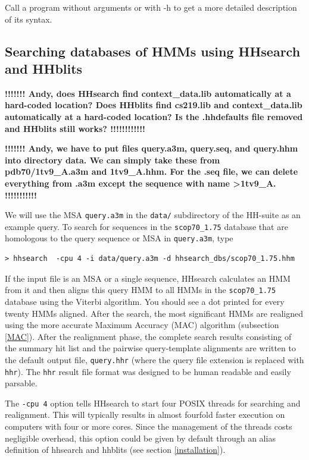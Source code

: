 \documentclass[11pt,a4paper]{article}
\begin{document}
Call a program without arguments or with -h to get a more detailed description of 
its syntax.


\subsection{Searching databases of HMMs using HHsearch and HHblits}\label{searching_hm_dbs}

{\bf !!!!!!! Andy, does HHsearch find context\_data.lib automatically at a hard-coded location? Does HHblits find cs219.lib and context\_data.lib automatically at a hard-coded location? Is the .hhdefaults file removed and HHblits still works? !!!!!!!!!!!!}

{\bf !!!!!!! Andy, we have to put files query.a3m, query.seq, and query.hhm into directory data. We can simply take these from pdb70/1tv9\_A.a3m and 1tv9\_A.hhm. For the .seq file, we can delete everything from .a3m except the sequence with name >1tv9\_A. !!!!!!!!!!!}

We will use the MSA \verb`query.a3m` in the \verb`data/` subdirectory of the HH-suite as an example query. To search for sequences in the \verb`scop70_1.75` database that are homologous to the query sequence or MSA in \verb`query.a3m`, type

\begin{verbatim}
> hhsearch  -cpu 4 -i data/query.a3m -d hhsearch_dbs/scop70_1.75.hhm
\end{verbatim}

If the input file is an MSA or a single sequence, HHsearch calculates an HMM from it
and then aligns this query HMM to all 
HMMs in the \verb`scop70_1.75` database using the Viterbi algorithm. 
You should see a dot printed for every twenty HMMs aligned. After the search, 
the most significant HMMs are realigned using the more accurate Maximum Accuracy (MAC) 
algorithm (subsection \ref{MAC}). After the realignment phase, the complete search results consisting of the 
summary hit list and the pairwise query-template alignments are written to the default 
output file, \verb`query.hhr` (where the query file extension is replaced with \verb`hhr`). 
The \verb`hhr` result file format was designed to be human readable and easily parsable.

The \verb`-cpu 4` option tells HHsearch to start four POSIX threads for searching and realignment. This will typically results in almost fourfold faster execution on computers with four or more cores. Since the management of the threads costs negligible overhead, this option could be given by default through an alias definition of hhsearch and hhblits (see section \ref{installation}). 
\end{document}
